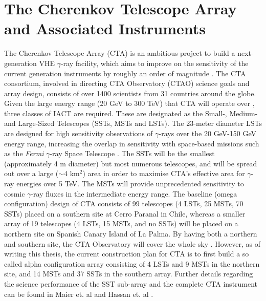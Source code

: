 \section{The Cherenkov Telescope Array and Associated Instruments}
The Cherenkov Telescope Array (CTA) is an ambitious project to build a next-generation VHE $\gamma$-ray facility, which aims to improve on the sensitivity of the current generation instruments by roughly an order of magnitude \cite{scienceCTA}. The CTA consortium, involved in directing CTA Observatory (CTAO) science goals and array design, consists of over 1400 scientists from 31 countries around the globe. Given the large energy range (20 GeV to 300 TeV) that CTA will operate  over \cite{scienceCTA}, three classes of IACT are required. These are designated as the Small-, Medium- and Large-Sized Telescopes (SSTs, MSTs and LSTs). The 23-meter diameter LSTs are designed for high sensitivity observations of $\gamma$-rays over the 20 GeV-150 GeV energy range, increasing the overlap in sensitivity with space-based missions such as the \textit{Fermi} $\gamma$-ray Space Telescope \cite{Fermi}. The SSTs will be the smallest (approximately 4 m diameter) but most numerous telescopes, and will be spread out over a large ($\sim$4 km$^2$) area in order to maximise CTA's effective area for $\gamma$-ray energies over 5 TeV. The MSTs will provide unprecedented sensitivity to cosmic $\gamma$-ray fluxes in the intermediate energy range. The baseline (omega configuration) design of CTA consists of 99 telescopes (4 LSTs, 25 MSTs, 70 SSTs) placed on a southern site at Cerro Paranal in Chile, whereas a smaller array of 19 telescopes (4 LSTs, 15 MSTs, and no SSTs) will be placed on a northern site on Spanish Canary Island of La Palma. By having both a northern and southern site, the CTA Observatory will cover the whole sky \cite{scienceCTA}. However, as of writing this thesis, the current construction plan for CTA is to first build a so called alpha configuration array consisting of 4 LSTs and 9 MSTs in the northern site, and 14 MSTs and 37 SSTs in the southern array. Further details regarding the science performance of the SST sub-array and the complete CTA instrument can be found in Maier et. al \cite{gernotCTA} and Hassan et. al \cite{tarekCTA}.
